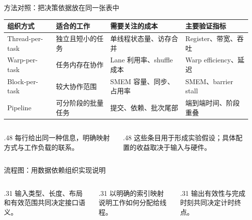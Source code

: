 \begin{frame}{方法对照：把决策依据放在同一张表中}
\begin{tabularx}{\textwidth}{@{}>{\raggedright\arraybackslash}p{2.65cm}XXX@{}}
\toprule 组织方式 & 适合的工作 & 需要关注的成本 & 主要验证指标 \\\midrule
Thread-per-task & 独立且短小的任务 & 单线程状态量、访存合并 & Register、带宽、吞吐 \\
Warp-per-task & 任务内存在协作 & Lane 利用率、shuffle 成本 & Warp efficiency、延迟 \\
Block-per-task & 较大协作范围 & SMEM 容量、同步、占用率 & SMEM、barrier stall \\
Pipeline & 可分阶段的批量任务 & 提交、依赖、批次尾部 & 端到端时间、阶段重叠 \\\bottomrule
\end{tabularx}
\begin{columns}[T,onlytextwidth]
\begin{column}{.48\textwidth}
每行给出同一种信息，明确映射方式与工作负载的联系。
\end{column}
\begin{column}{.48\textwidth}
这些条目用于形成实验假设；具体配置的收益取决于输入与硬件。
\end{column}
\end{columns}
\end{frame}

\begin{frame}{流程图：用数据依赖组织实现说明}
\vspace{3mm}
\begin{columns}[T,onlytextwidth]
\begin{column}{.31\textwidth}
输入类型、长度、布局和有效范围共同决定接口语义。
\end{column}
\begin{column}{.31\textwidth}
以明确的索引映射说明工作如何分配给线程。
\end{column}
\begin{column}{.31\textwidth}
输出有效性与完成时刻共同决定计时终点。
\end{column}
\end{columns}
\end{frame}
